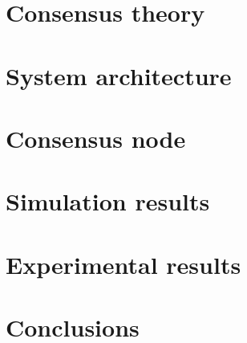 \documentclass[a4paper,twoside,12pt]{book}
\begin{document}
\chapter{Consensus theory\label{chap:consensus_theory}}


\chapter{System architecture\label{chap:system_architecture}}


\chapter{Consensus node\label{chap:consensus_node}}


\chapter{Simulation results\label{chap:simulation_results}}


\chapter{Experimental results\label{chap:experimental_results}}


\chapter*{Conclusions}





\end{document}

